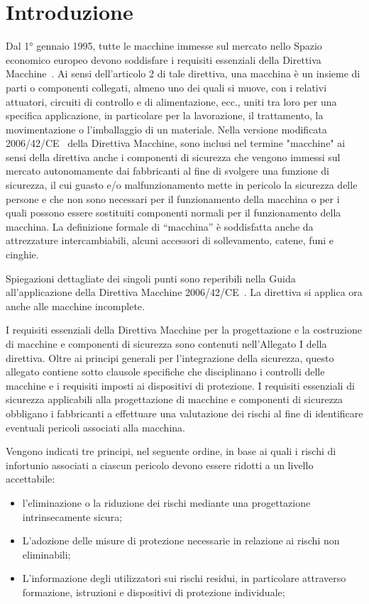 \chapter{Introduzione}
\label{cap:02}

Dal 1° gennaio 1995, tutte le macchine immesse sul mercato nello Spazio economico europeo devono soddisfare i requisiti essenziali della Direttiva Macchine~\cite{dir1998-37-ce}. Ai sensi dell'articolo 2 di tale direttiva, una macchina è un insieme di parti o componenti collegati, almeno uno dei quali si muove, con i relativi attuatori, circuiti di controllo e di alimentazione, ecc., uniti tra loro per una specifica applicazione, in particolare per la lavorazione, il trattamento, la movimentazione o l'imballaggio di un materiale. Nella versione modificata 2006/42/CE~\cite{dir2006-42-ce} della Direttiva Macchine, sono inclusi nel termine "macchine" ai sensi della direttiva anche i componenti di sicurezza che vengono immessi sul mercato autonomamente dai fabbricanti al fine di svolgere una funzione di sicurezza, il cui guasto e/o malfunzionamento mette in pericolo la sicurezza delle persone e che non sono necessari per il funzionamento della macchina o per i quali possono essere sostituiti componenti normali per il funzionamento della macchina. La definizione formale di “macchina” è soddisfatta anche da attrezzature intercambiabili, alcuni accessori di sollevamento, catene, funi e cinghie.

Spiegazioni dettagliate dei singoli punti sono reperibili nella Guida all'applicazione della Direttiva Macchine
2006/42/CE~\cite{dir2006-42-ce}. La direttiva si applica ora anche alle macchine incomplete.

I requisiti essenziali della Direttiva Macchine per la progettazione e la costruzione di macchine e componenti di sicurezza sono contenuti nell'Allegato I della direttiva. Oltre ai principi generali per l'integrazione della sicurezza, questo allegato contiene sotto clausole specifiche che disciplinano i controlli delle macchine e i requisiti imposti ai dispositivi di protezione. I requisiti essenziali di sicurezza applicabili alla progettazione di macchine e componenti di sicurezza obbligano i fabbricanti a effettuare una valutazione dei rischi al fine di identificare eventuali pericoli associati alla macchina. 

Vengono indicati tre principi, nel seguente ordine, in base ai quali i rischi di infortunio associati a ciascun pericolo devono essere ridotti a un livello accettabile:
\begin{itemize}
	\item l'eliminazione o la riduzione dei rischi mediante una progettazione intrinsecamente sicura;
	\item L'adozione delle misure di protezione necessarie in relazione ai rischi non eliminabili;
	\item L'informazione degli utilizzatori sui rischi residui, in particolare attraverso formazione, istruzioni e dispositivi di protezione individuale;
\end{itemize}

